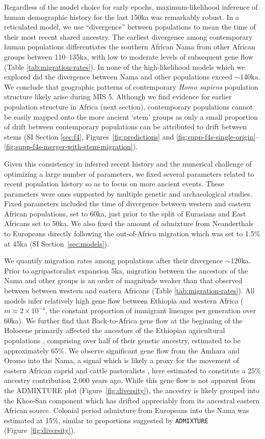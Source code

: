 \documentclass[]{article}
\begin{document}
Regardless of the model choice for early epochs, maximum-likelihood inference
of human demographic history for the last 150ka was remarkably robust.  In a
reticulated model, we use ``divergence'' between populations to mean the time
of their most recent shared ancestry. The earliest divergence among
contemporary human populations differentiates the southern African Nama from
other African groups between 110--135ka, with low to moderate levels of
subsequent gene flow (Table \ref{tab:migration-rates}). In none of the
high-likelihood models which we explored did the divergence between Nama and
other populations exceed $\sim$140ka. We conclude that geographic patterns of
contemporary \emph{Homo sapiens} population structure likely arise during MIS
5. Although we find evidence for earlier population structure in Africa (next
section), contemporary populations cannot be easily mapped onto the more
ancient `stem' groups as only a small proportion of drift between contemporary
populations can be attributed to drift between stems (SI Section \ref{sec:f4},
Figures~\ref{fig:predictions} and
\ref{fig:supp-f4s-single-origin}--\ref{fig:supp-f4s-merger-with-stem-migration}).

Given this consistency in inferred recent history and the numerical challenge
of optimizing a large number of parameters, we fixed several parameters related
to recent population history so as to focus on more ancient events. These
parameters were ones supported by multiple genetic and archaeological studies.
Fixed parameters included the time of divergence between western and eastern
African populations, set to 60ka, just prior to the split of Eurasians and East
Africans set to 50ka. We also fixed the amount of admixture from Neanderthals
to Europeans directly following the out-of-Africa migration which was set to
1.5\% at 45ka (SI Section~\ref{sec:models}).

We quantify migration rates among populations after their divergence
$\sim$120ka. Prior to agripastoralist expansion 5ka, migration between the
ancestors of the Nama and other groups is an order of magnitude weaker than
that observed between between western and eastern Africans (Table
\ref{tab:migration-rates}). All models infer relatively high gene flow between
Ethiopia and western Africa ($m\approx2\times10^{-4}$, the constant proportion
of immigrant lineages per generation over 60ka). We further find that
Back-to-Africa gene flow at the beginning of the Holocene primarily affected
the ancestors of the Ethiopian agricultural populations
\citep{Molinaro2019-rf}, comprising over half of their genetic ancestry,
estimated to be approximately 65\%. We observe significant gene flow from the
Amhara and Oromo into the Nama, a signal which is likely a proxy for the
movement of eastern African caprid and cattle pastoralists
\citep{Henn2008-xo,Breton2014-xb}, here estimated to constitute a 25\% ancestry
contribution 2,000 years ago. While this gene flow is not apparent from the
ADMIXTURE plot (Figure~\ref{fig:diversity}), the ancestry is likely grouped
into the Khoe-San component which has drifted appreciably from its ancestral
eastern African source. Colonial period admixture from Europeans into the Nama
was estimated at 15\%, similar to proportions suggested by \texttt{ADMIXTURE}
(Figure~\ref{fig:diversity}).
\end{document}
